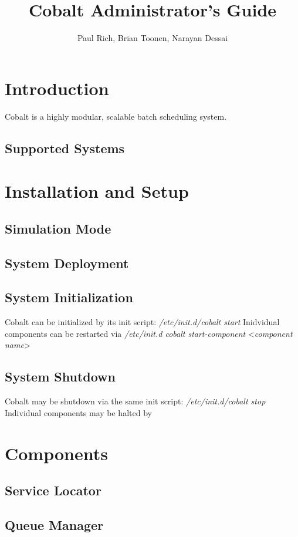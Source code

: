 \documentclass[10pt,letterpaper]{book}
\begin{document}
\title {\textbf{Cobalt Administrator's Guide}}
\author{Paul Rich, Brian Toonen, Narayan Dessai}

\maketitle
\tableofcontents
\chapter{Introduction}
Cobalt is a highly modular, scalable batch scheduling system.  
\section{Supported Systems}

\chapter{Installation and Setup}
\section{Simulation Mode}
\section{System Deployment}
\section{System Initialization}
Cobalt can be initialized by its init script: \textit{/etc/init.d/cobalt start}
Inidvidual components can be restarted via \textit{/etc/init.d cobalt start-component} \textless\textit{component name}\textgreater
\section{System Shutdown}
Cobalt may be shutdown via the same init script: \textit{/etc/init.d/cobalt stop}
Individual components may be halted by 

\chapter{Components}
\section{Service Locator}
\section{Queue Manager}
\end{document}
